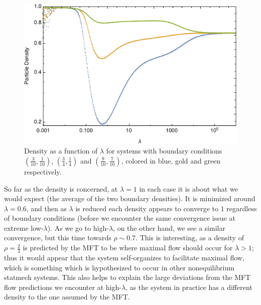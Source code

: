 \documentclass[
reprint,
 amsmath,amssymb,
 aps,
 prl,
]{revtex4-1}
\begin{document}
\begin{figure}[h!]
\vspace{1em}
\caption{\label{fig:largeDensity} Density as a function of $\lambda$ for systems with boundary conditions $(\frac{3}{10}, \frac{1}{10})$, $(\frac{3}{4}, \frac{1}{4})$ and $(\frac{9}{10}, \frac{7}{10})$, colored in blue, gold and green
respectively.}
    \includegraphics[width=0.95\linewidth]{images/largeRangeDensity}
    \vspace{0em}
\end{figure}
So far as the density is concerned, at $\lambda=1$ in each case it is about what we would expect (the average of the two boundary densities). It is minimized around $\lambda = 0.6$, and then as $\lambda$ is reduced each density appears to 
converge to $1$ regardless of boundary conditions (before we encounter the same convergence issue at extreme low-$\lambda$). As we go to high-$\lambda$, on the other hand, we see a similar convergence, but this time towards $\rho \sim 0.7$.
This is interesting, as a density of $\rho=\frac{2}{3}$ is predicted by the MFT to be where maximal flow should occur for $\lambda>1$; thus it would appear that the system self-organizes to facilitate maximal flow, which is something which
is hypothesized to occur in other nonequilibrium statmech systems. This also helps to explain the large deviations from the MFT flow predictions we encounter at high-$\lambda$, as the system in practice has a different density to the one assumed
by the MFT.
\end{document}

